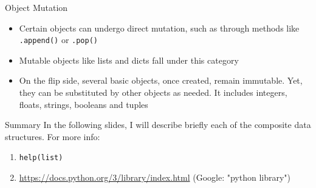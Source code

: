 \documentclass[
	11pt, 
]{beamer}
\begin{document}
\begin{frame}[fragile]{Object Mutation}
\begin{itemize}

\item  Certain objects can undergo direct mutation, such as through methods like \texttt{.append()} or \texttt{.pop()}

\item Mutable objects like lists and dicts fall under this category

\item On the flip side, several basic objects, once created, remain immutable. Yet, they can be substituted by other objects as needed. It includes integers, floats, strings, booleans and tuples
\end{itemize}


\begin{alertblock}{Summary}
    In the following slides, I will describe briefly each of the composite data structures. For more info:
    \begin{enumerate}

\item  \texttt{help(list)}

\item  \url{https://docs.python.org/3/library/index.html} (Google: "python library")
    \end{enumerate}
\end{alertblock}
\end{frame}


\end{document}
